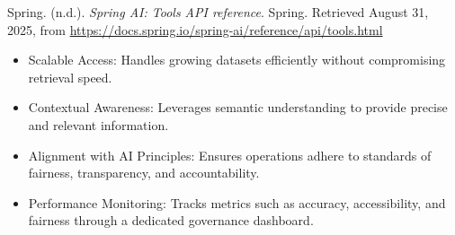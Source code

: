 Spring. (n.d.). \textit{Spring AI: Tools API reference}. Spring. Retrieved August 31, 2025, from \url{https://docs.spring.io/spring-ai/reference/api/tools.html}


\begin{itemize}

\item Scalable Access: Handles growing datasets efficiently without compromising retrieval speed.

\item Contextual Awareness: Leverages semantic understanding to provide precise and relevant information.

\end{itemize}


\begin{itemize}

\item Alignment with AI Principles: Ensures operations adhere to standards of fairness, transparency, and accountability.

\item Performance Monitoring: Tracks metrics such as accuracy, accessibility, and fairness through a dedicated governance dashboard.

\end{itemize}








